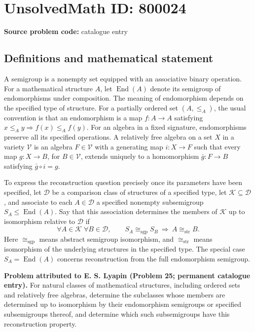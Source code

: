 \documentclass[11pt]{article}
\begin{document}
\section*{UnsolvedMath ID: 800024}
\textbf{Source problem code:} catalogue entry
\subsection{Definitions and mathematical statement}
A semigroup is a nonempty set equipped with an associative binary operation. For a mathematical structure \(A\), let \(\operatorname{End}(A)\) denote its semigroup of endomorphisms under composition. The meaning of endomorphism depends on the specified type of structure. For a partially ordered set \((A,\leq_A)\), the usual convention is that an endomorphism is a map \(f:A\to A\) satisfying \(x\leq_A y\Rightarrow f(x)\leq_A f(y)\). For an algebra in a fixed signature, endomorphisms preserve all its specified operations. A relatively free algebra on a set \(X\) in a variety \(\mathcal V\) is an algebra \(F\in\mathcal V\) with a generating map \(i:X\to F\) such that every map \(g:X\to B\), for \(B\in\mathcal V\), extends uniquely to a homomorphism \(\bar g:F\to B\) satisfying \(\bar g\circ i=g\).

To express the reconstruction question precisely once its parameters have been specified, let \(\mathcal D\) be a comparison class of structures of a specified type, let \(\mathcal K\subseteq\mathcal D\), and associate to each \(A\in\mathcal D\) a specified nonempty subsemigroup \(S_A\leq\operatorname{End}(A)\). Say that this association determines the members of \(\mathcal K\) up to isomorphism relative to \(\mathcal D\) if
\[
\forall A\in\mathcal K\;\forall B\in\mathcal D,\qquad
S_A\cong_{\mathrm{sgp}}S_B\ \Longrightarrow\ A\cong_{\mathrm{str}}B.
\]
Here \(\cong_{\mathrm{sgp}}\) means abstract semigroup isomorphism, and \(\cong_{\mathrm{str}}\) means isomorphism of the underlying structures in the specified type. The special case \(S_A=\operatorname{End}(A)\) concerns reconstruction from the full endomorphism semigroup.

\textbf{Problem attributed to E. S. Lyapin (Problem 25; permanent catalogue entry).} For natural classes of mathematical structures, including ordered sets and relatively free algebras, determine the subclasses whose members are determined up to isomorphism by their endomorphism semigroups or specified subsemigroups thereof, and determine which such subsemigroups have this reconstruction property.
\end{document}
